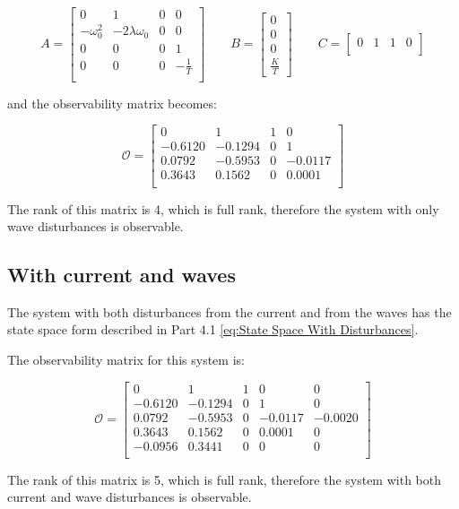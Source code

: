 \begin{equation}
    A = 
	\begin{bmatrix}
    0           & 1                 & 0 & 0\\
	-\omega_0^2 & -2\lambda\omega_0 & 0 & 0\\
	0           & 0                 & 0 & 1\\
	0           & 0                 & 0 & -\frac{1}{T}\\
	\end{bmatrix}
  \qquad
  B =
  \begin{bmatrix}
	0 \\
    0 \\
    0 \\
    \frac{K}{T}
  \end{bmatrix}
  \qquad
  C =
  \begin{bmatrix}
    0 & 1 & 1 & 0\\
  \end{bmatrix}
\end{equation}

and the observability matrix becomes:



\begin{equation}
  \bm{\mathcal{O}} =
  \begin{bmatrix}
    0      &  1       & 1   & 0 \\
   -0.6120 &  -0.1294 & 0   & 1 \\
    0.0792 &  -0.5953 & 0   & -0.0117 \\
    0.3643 &   0.1562 & 0   & 0.0001 \\
  \end{bmatrix}
\end{equation}

The rank of this matrix is 4, which is full rank, therefore the system with only wave disturbances is observable.
\subsection{With current and waves}
The system with both disturbances from the current and from the waves has the state space form described in Part 4.1 \cref{eq:State Space With Disturbances}.

The observability matrix for this system is:

\begin{equation}
  \bm{\mathcal{O}} =
  \begin{bmatrix}
         0  &       1  &       1 &        0 &  0 \\
   -0.6120  & -0.1294  &       0 &        1 &  0 \\
    0.0792  & -0.5953  &       0 &  -0.0117 &  -0.0020 \\
    0.3643  &  0.1562  &       0 &   0.0001 &  0 \\
   -0.0956  &  0.3441  &       0 &        0 &  0 \\
  \end{bmatrix}
\end{equation}

The rank of this matrix is 5, which is full rank, therefore the system with both current and wave disturbances is observable.
